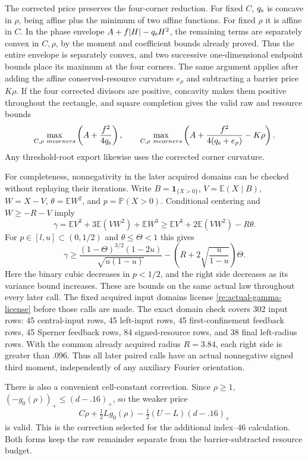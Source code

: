 The corrected price preserves the four-corner reduction. For fixed $C$,
$q_{\rm s}$ is concave in $\rho$, being affine plus the minimum of two
affine functions. For fixed $\rho$ it is affine in $C$. In the phase
envelope $A+f|H|-q_{\rm s}H^2$, the remaining terms are separately
convex in $C,\rho$, by the moment and coefficient bounds already proved.
Thus the entire envelope is separately convex, and two successive
one-dimensional endpoint bounds place its maximum at the four corners.
The same argument applies after adding the affine conserved-resource
curvature $e_\rho$ and subtracting a barrier price $K\rho$.
If the four corrected divisors are positive, concavity makes them
positive throughout the rectangle, and square completion gives the
valid raw and resource bounds
\[
 \max_{C,\rho\ {
m corners}}\left(A+\frac{f^2}{4q_{\rm s}}\right),
 \qquad
 \max_{C,\rho\ {
m corners}}
       \left(A+\frac{f^2}{4(q_{\rm s}+e_\rho)}-K\rho\right).
\]
Any threshold-root export likewise uses the corrected corner curvature.

For completeness, nonnegativity in the later acquired domains can be checked
without replaying their iterations. Write $B=\mathbf1_{\{X>0\}}$,
$V=\mathbb E(X\mid B)$,
$W=X-V$, $\theta=\mathbb E W^2$, and $p=\mathbb P(X>0)$. Conditional
centering and $W\ge-R-V$ imply
\[
 \gamma=\mathbb EV^3+3\mathbb E(VW^2)+\mathbb EW^3
 \ge\mathbb EV^3+2\mathbb E(VW^2)-R\theta.
\]
For $p\in[l,u]\subset(0,1/2)$ and $\theta\le\Theta<1$ this gives
\begin{equation}\label{re:actual-gamma-license}
 \gamma\ge
 \frac{(1-\Theta)^{3/2}(1-2u)}{\sqrt{u(1-u)}}
 -\left(R+2\sqrt{\frac{u}{1-u}}\right)\Theta.
\end{equation}
Here the binary cubic decreases in $p<1/2$, and the right side decreases
as its variance bound increases. These are bounds on the same actual law
throughout every later call. The fixed acquired input domains license
\eqref{re:actual-gamma-license} before those calls are made.
The exact domain check covers 302 input rows: 45 central-input rows,
45 left-input rows, 45 first-confinement feedback rows, 45 Sperner feedback
rows, 84 signed-resource rows, and 38 final left-radius rows. With the
common already acquired radius $R=3.84$, each right side is greater than
$.096$. Thus all later paired calls have an actual nonnegative signed
third moment, independently of any auxiliary Fourier orientation.

There is also a convenient cell-constant correction. Since $\rho\ge1$,
$(-g_0(\rho))_+\le(d-.16)_+$, so the weaker price
\[
 C\rho+\tfrac12L g_0(\rho)
       -\tfrac12(U-L)(d-.16)_+
\]
is valid. This is the correction selected for the additional index--46
calculation. Both forms keep the raw remainder separate from the
barrier-subtracted resource budget.

